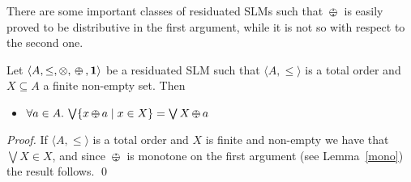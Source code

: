 \documentclass{llncs}
\def\1{{\mathbf 1}}
\newcommand{\shortNoProof}[1]{ }
\def\monid{{\mathbf 0}}
\def\1{{\mathbf 1}}
\def\monop{\otimes}
\def\odiv{\, {\ominus\hspace{-7.7pt} \div} \,}
\def\monid{\mathbf{1}}
\begin{document}
\shortNoProof
{
\begin{proof}
Note that $1$ immediately implies both $2$ and $3$, since by definition $a \leq b$ implies $\1 \leq b \odiv a$
and $\1$ is the top of the partial order.

For the second step, first note that both properties implies that $\1 \odiv a \leq \1$ for all $a \in A$. This is immediate
for $2$. As for $3$, %
consider $b = \bigvee \{\1, a \}$. By Lemma~\ref{distodiv} we have that
$\bigvee \{\1 \odiv a, a \odiv a\} \leq \bigvee \{\1, a \} \odiv a$. 
Hence, $\1 \odiv a \leq \1$ for all $a \in A$, and the result follows.

Finally, note that $\1 \odiv a \leq \1$ for all $a \in A$ implies that $\1 \odiv (\1 \odiv c) \leq \1$ for all $c \in A$, 
and since it always holds
that $c \leq \1 \odiv (\1 \odiv c)$, then $3$ implies $1$.
\qed
\end{proof}
}

There are some important classes of residuated SLMs  such that $\odiv$ is easily proved to be distributive in the first argument,
while it is not so with respect to the second one.

\begin{lemma}
	\label{distodiv2}
	Let $\langle A, \leq, \monop, \odiv, \monid \rangle$ be a residuated SLM such that $\langle A, \leq \rangle$ is a total order and $X \subseteq A$ a finite non-empty set. Then 
	\begin{itemize}
		\item $\forall a \in A.\, \bigvee \{ x \odiv a \mid x \in X \} = \bigvee X \odiv a$
	\end{itemize}	
\end{lemma}

\begin{proof}
If $\langle A, \leq \rangle$ is a total order and $X$ is finite and non-empty we have that $\bigvee X \in X$, and since $\odiv$ 
is monotone on the first argument (see Lemma~\ref{mono}) the result follows.
\qed
\end{proof}
\end{document}
